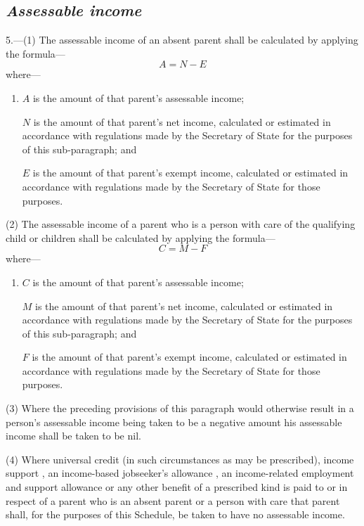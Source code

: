 \documentclass[12pt,a4paper]{article}
\begin{document}

\subsection*{\itshape Assessable income}

5.---(1) The assessable income of an absent parent shall be calculated by applying the formula—
\[
A = N - E
\]
where—
\begin{enumerate}\item[]
    $A$ is the amount of that parent’s assessable income;

    $N$ is the amount of that parent’s net income, calculated or estimated in accordance with regulations made by the Secretary of State for the purposes of this sub-paragraph; and

    $E$ is the amount of that parent’s exempt income, calculated or estimated in accordance with regulations made by the Secretary of State for those purposes. 
\end{enumerate}

(2) The assessable income of a parent who is a person with care of the qualifying child or children shall be calculated by applying the formula—
\[
C = M - F
\]
where—
\begin{enumerate}\item[]
    $C$ is the amount of that parent’s assessable income;

    $M$ is the amount of that parent’s net income, calculated or estimated in accordance with regulations made by the Secretary of State for the purposes of this sub-paragraph; and

    $F$ is the amount of that parent’s exempt income, calculated or estimated in accordance with regulations made by the Secretary of State for those purposes. 
\end{enumerate}

(3) Where the preceding provisions of this paragraph would otherwise result in a person’s assessable income being taken to be a negative amount his assessable income shall be taken to be nil.

(4) Where 
universal credit (in such circumstances as may be prescribed),  %
income support%
, an income-based jobseeker’s allowance%
 , an income-related employment and support allowance  %
 or any other benefit of a prescribed kind is paid to or in respect of a parent who is an absent parent or a person with care that parent shall, for the purposes of this Schedule, be taken to have no assessable income.
\end{document}

